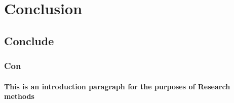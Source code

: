 \section{Conclusion}
\subsection{Conclude}
\subsubsection{Con}
\paragraph{This is an introduction paragraph for the purposes of Research methods}